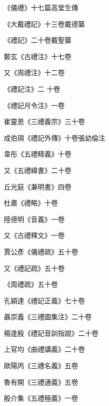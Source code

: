 \begin{pinyinscope}
 《儀禮》十七篇高堂生傳



 《大戴禮記》十三卷戴德纂



 《禮記》二十卷戴聖纂



 鄭玄《古禮注》十七卷



 又《周禮注》十二卷



 《禮記注》二
 十卷



 《禮記月令注》一卷



 崔靈恩《三禮義宗》三十卷



 成伯璵《禮記外傳》十卷張幼倫注



 韋彤《五禮精義》十卷



 又《五禮緯書》二十卷



 丘光庭《兼明書》四卷



 杜肅《禮略》十卷



 陸德明《音義》一卷



 又《古禮釋文》一卷



 賈公彥《儀禮疏》五十卷



 又《禮記疏》五十卷



 《周禮疏》五十卷



 孔穎達《禮記正義》七十卷



 聶崇義《三禮圖集注》二十卷



 楊逢殷《禮記音訓指說》二十卷



 上官均《曲禮講義》二十卷



 歐陽丙《三禮名義》五卷



 魯有開《三禮通義》五卷



 殷介集《五禮極義》一卷




\end{pinyinscope}
